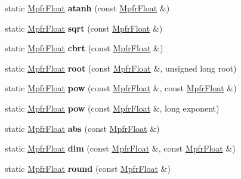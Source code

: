 \begin{DoxyCompactItemize}
static \hyperlink{class_mpfr_float}{Mpfr\+Float} {\bfseries atanh} (const \hyperlink{class_mpfr_float}{Mpfr\+Float} \&)
\item 
\mbox{\label{class_mpfr_float_a2ea23ca0fc60b4318ec32f7d34e8650d}} 
static \hyperlink{class_mpfr_float}{Mpfr\+Float} {\bfseries sqrt} (const \hyperlink{class_mpfr_float}{Mpfr\+Float} \&)
\item 
\mbox{\label{class_mpfr_float_ac536c18f4eccd3503cefe9f9882783a6}} 
static \hyperlink{class_mpfr_float}{Mpfr\+Float} {\bfseries cbrt} (const \hyperlink{class_mpfr_float}{Mpfr\+Float} \&)
\item 
\mbox{\label{class_mpfr_float_a077ce8992be43a49b52d6a81921ac26f}} 
static \hyperlink{class_mpfr_float}{Mpfr\+Float} {\bfseries root} (const \hyperlink{class_mpfr_float}{Mpfr\+Float} \&, unsigned long root)
\item 
\mbox{\label{class_mpfr_float_a7e1f2d1da28990f0770a212d7c241afb}} 
static \hyperlink{class_mpfr_float}{Mpfr\+Float} {\bfseries pow} (const \hyperlink{class_mpfr_float}{Mpfr\+Float} \&, const \hyperlink{class_mpfr_float}{Mpfr\+Float} \&)
\item 
\mbox{\label{class_mpfr_float_a13118af8ab658d366e835e1550e461dd}} 
static \hyperlink{class_mpfr_float}{Mpfr\+Float} {\bfseries pow} (const \hyperlink{class_mpfr_float}{Mpfr\+Float} \&, long exponent)
\item 
\mbox{\label{class_mpfr_float_a8140e99f8e2a452cb00eb29948fb7609}} 
static \hyperlink{class_mpfr_float}{Mpfr\+Float} {\bfseries abs} (const \hyperlink{class_mpfr_float}{Mpfr\+Float} \&)
\item 
\mbox{\label{class_mpfr_float_aa33fcf1e5d51e835a42f94c772df6ed8}} 
static \hyperlink{class_mpfr_float}{Mpfr\+Float} {\bfseries dim} (const \hyperlink{class_mpfr_float}{Mpfr\+Float} \&, const \hyperlink{class_mpfr_float}{Mpfr\+Float} \&)
\item 
\mbox{\label{class_mpfr_float_aa9eb65ad04c72f50eade8cc347a49543}} 
static \hyperlink{class_mpfr_float}{Mpfr\+Float} {\bfseries round} (const \hyperlink{class_mpfr_float}{Mpfr\+Float} \&)

\end{DoxyCompactItemize}
